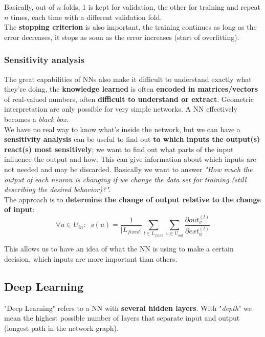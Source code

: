Basically, out of $n$ folds, 1 is kept for validation, the other for training and repeat $n$ times, each time with a different validation fold.\\

The \textbf{stopping criterion} is also important, the training continues as long as the error decreases, it stops as soon as the error increases (start of overfitting).\\


\newpage

\subsubsection{Sensitivity analysis}
The great capabilities of NNs also make it difficult to understand exactly what they're doing, the \textbf{knowledge learned} is often \textbf{encoded in matrices/vectors} of real-valued numbers, often \textbf{difficult to understand or extract}. Geometric interpretation are only possible for very simple networks. A NN effectively becomes a \textit{black box}.\\

We have no real way to know what's inside the network, but we can have a \textbf{sensitivity analysis} can be useful to find out \textbf{to which inputs the output(s) react(s) most sensitively}; we want to find out what parts of the input influence the output and how. This can give information about which inputs are not needed and may be discarded. Basically we want to answer \textit{"How much the output of each neuron is changing if we change
	the data set for training (still describing the desired behavior)?"}.\\

The approach is to \textbf{determine the change of output relative to the change of input}:
$$ \forall u \in U_{in}: \;\; s(u) = \frac{1}{|L_{fixed}|} \sum_{l \in L_{fixed}} \sum_{v \in U_{out}} \frac{\partial out_v^{(l)}}{\partial ext_u^{(l)}} $$

This allows us to have an idea of what the NN is using to make a certain decision, which inputs are more important than others.\\


\newpage

\subsection{Deep Learning}
"Deep Learning" refers to a NN with \textbf{several hidden layers}. With "\textit{depth}" we mean the highest possible number of layers that separate input and output (longest path in the network graph).\\

